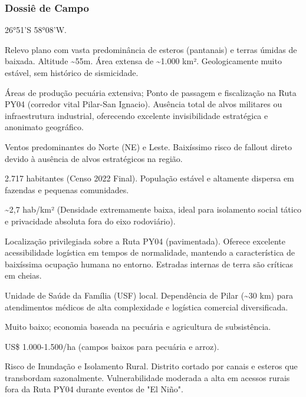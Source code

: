 \subsubsection{Dossiê de Campo}
\begin{description}[style=nextline,leftmargin=0.5cm,font=\bfseries]
\item[Coordenadas]  26°51'S 58°08'W.
\item[Topografia]  Relevo plano com vasta predominância de esteros (pantanais) e terras úmidas de baixada. Altitude \textasciitilde 55m. Área extensa de \textasciitilde 1.000 km². Geologicamente muito estável, sem histórico de sismicidade.
\item[Alvos Estratégicos]  Áreas de produção pecuária extensiva; Ponto de passagem e fiscalização na Ruta PY04 (corredor vital Pilar-San Ignacio). Ausência total de alvos militares ou infraestrutura industrial, oferecendo excelente invisibilidade estratégica e anonimato geográfico.
\item[Fallout]  Ventos predominantes do Norte (NE) e Leste. Baixíssimo risco de fallout direto devido à ausência de alvos estratégicos na região.
\item[População]  2.717 habitantes (Censo 2022 Final). População estável e altamente dispersa em fazendas e pequenas comunidades.
\item[Densidade]  \textasciitilde 2,7 hab/\allowbreak km² (Densidade extremamente baixa, ideal para isolamento social tático e privacidade absoluta fora do eixo rodoviário).
\item[Vias de Acesso]  Localização privilegiada sobre a Ruta PY04 (pavimentada). Oferece excelente acessibilidade logística em tempos de normalidade, mantendo a característica de baixíssima ocupação humana no entorno. Estradas internas de terra são críticas em cheias.
\item[Serviços]  Unidade de Saúde da Família (USF) local. Dependência de Pilar (\textasciitilde 30 km) para atendimentos médicos de alta complexidade e logística comercial diversificada.
\item[Custo de Vida]  Muito baixo; economia baseada na pecuária e agricultura de subsistência.
\item[Preço da Terra]  US\$ 1.000-1.500/\allowbreak ha (campos baixos para pecuária e arroz).
\item[Hidrologia]  Risco de Inundação e Isolamento Rural. Distrito cortado por canais e esteros que transbordam sazonalmente. Vulnerabilidade moderada a alta em acessos rurais fora da Ruta PY04 durante eventos de "El Niño".

\end{description}
